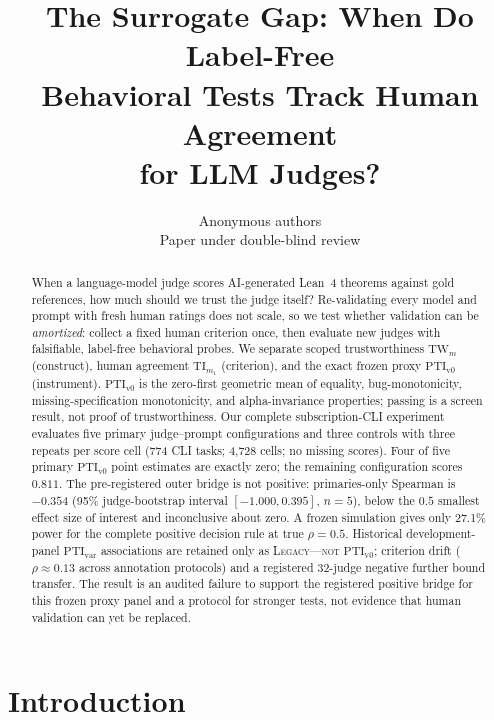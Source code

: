 \documentclass{article}
\title{The Surrogate Gap: When Do Label-Free\\ Behavioral Tests Track Human Agreement\\ for LLM Judges?}
\author{Anonymous authors\\
Paper under double-blind review\\
}
\newcommand{\TW}{\mathrm{TW}}                    %
\newcommand{\TI}{\mathrm{TI}}                    %
\newcommand{\PTI}{\mathrm{PTI}}                  %
\newcommand{\TIm}[1]{\TI_{m_{#1}}}
\newcommand{\PTIvzero}{\PTI_{\mathrm{v0}}}        %
\newcommand{\PTIvar}{\PTI_{\mathrm{var}}}        %
\begin{document}
\maketitle

\begin{abstract}
When a language-model judge scores AI-generated Lean~4 theorems against gold references, how much should we trust the judge itself? Re-validating every model and prompt with fresh human ratings does not scale, so we test whether validation can be \emph{amortized}: collect a fixed human criterion once, then evaluate new judges with falsifiable, label-free behavioral probes. We separate scoped trustworthiness $\TW_m$ (construct), human agreement $\TIm{1}$ (criterion), and the exact frozen proxy $\PTIvzero$ (instrument). $\PTIvzero$ is the zero-first geometric mean of equality, bug-monotonicity, missing-specification monotonicity, and alpha-invariance properties; passing is a screen result, not proof of trustworthiness. Our complete subscription-CLI experiment evaluates five primary judge--prompt configurations and three controls with three repeats per score cell (774 CLI tasks; 4,728 cells; no missing scores). Four of five primary $\PTIvzero$ point estimates are exactly zero; the remaining configuration scores $0.811$. The pre-registered outer bridge is not positive: primaries-only Spearman is $-0.354$ (95\% judge-bootstrap interval $[-1.000,0.395]$, $n{=}5$), below the $0.5$ smallest effect size of interest and inconclusive about zero. A frozen simulation gives only 27.1\% power for the complete positive decision rule at true $\rho=0.5$. Historical development-panel $\PTIvar$ associations are retained only as \textsc{Legacy---not $\PTIvzero$}; criterion drift ($\rho\approx0.13$ across annotation protocols) and a registered 32-judge negative further bound transfer. The result is an audited failure to support the registered positive bridge for this frozen proxy panel and a protocol for stronger tests, not evidence that human validation can yet be replaced.
\end{abstract}

\section{Introduction}\label{sec:intro}

\end{document}
